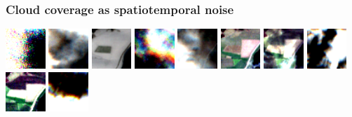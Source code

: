 \documentclass[%
  aspectratio=169,
  9pt,
ngerman,
  light,
  mathserif,
  professionalfont,
  affiliationintitlepagehead,
  titlegraphic,
   affiliation,
   navigationbar,
  progressbar,
]{beamer}
\begin{document}
\begin{frame}
	\frametitle{Cloud coverage as spatiotemporal noise}
	\centering
	
	\def\imagewidth{1.5cm}
	
	\includegraphics[width=\imagewidth]{images/activations/16494/x/x-0.png}
	\includegraphics[width=\imagewidth]{images/activations/16494/x/x-1.png}
	\includegraphics[width=\imagewidth]{images/activations/16494/x/x-2.png}
	\includegraphics[width=\imagewidth]{images/activations/16494/x/x-3.png}
	\includegraphics[width=\imagewidth]{images/activations/16494/x/x-4.png}
	\includegraphics[width=\imagewidth]{images/activations/16494/x/x-5.png}
	\includegraphics[width=\imagewidth]{images/activations/16494/x/x-6.png}
	\includegraphics[width=\imagewidth]{images/activations/16494/x/x-7.png}
	\includegraphics[width=\imagewidth]{images/activations/16494/x/x-8.png}
	\includegraphics[width=\imagewidth]{images/activations/16494/x/x-9.png}

\end{frame}
\end{document}
